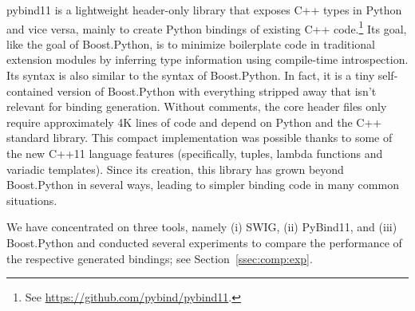 pybind11 is a lightweight header-only library that exposes C++
types in Python and vice versa, mainly to create Python bindings of
existing C++
code.\footnote{See \url{https://github.com/pybind/pybind11}.} Its
goal, like the goal of Boost.Python, is to minimize boilerplate code
in traditional extension modules by inferring type information using
compile-time introspection. Its syntax is also similar to the syntax of
Boost.Python. In fact, it is a tiny self-contained version of
Boost.Python with everything stripped away that isn't relevant for
binding generation. Without comments, the core header files only
require approximately 4K lines of code and depend on Python and the
C++ standard library. This compact implementation was possible thanks
to some of the new C++11 language features (specifically, tuples,
lambda functions and variadic templates). Since its creation, this
library has grown beyond Boost.Python in several ways, leading to
simpler binding code in many common situations.

We have concentrated on three tools, namely (i) SWIG, (ii) PyBind11,
and (iii) Boost.Python and conducted several experiments to compare
the performance of the respective generated bindings; see
Section~\ref{ssec:comp:exp}.

